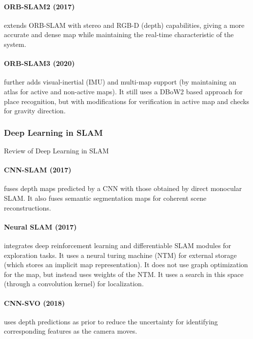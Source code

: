 \paragraph{ORB-SLAM2 (2017) \cite{MurArtal2016ORBSLAM2AO}} extends
ORB-SLAM with stereo and RGB-D (depth) capabilities, giving a more
accurate and dense map while maintaining the real-time characteristic
of the system. 

\paragraph{ORB-SLAM3 (2020) \cite{Campos2020ORBSLAM3AA}} further adds
visual-inertial (IMU) and multi-map support (by maintaining an atlas
for active and non-active maps). It still uses a DBoW2 based approach
for place recognition, but with modifications for verification in
active map and checks for gravity direction.

\subsubsection{Deep Learning in SLAM}

Review of Deep Learning in SLAM

\paragraph{CNN-SLAM (2017) \cite{Tateno2017CNNSLAMRD}} fuses depth
maps predicted by a CNN with those obtained by direct monocular SLAM.
It also fuses semantic segmentation maps for coherent scene
reconstructions.

\paragraph{Neural SLAM (2017) \cite{Zhang2017NeuralS}} integrates deep
reinforcement learning and differentiable SLAM modules for exploration
tasks. It uses a neural turing machine (NTM) \cite{Graves2014NeuralTM}
for external storage (which stores an implicit map representation). It
does not use graph optimization for the map, but instead uses weights
of the NTM. It uses a search in this space (through a convolution
kernel) for localization.

\paragraph{CNN-SVO (2018) \cite{Loo2018CNNSVOIT}} uses depth
predictions as prior to reduce the uncertainty for identifying
corresponding features as the camera moves.

